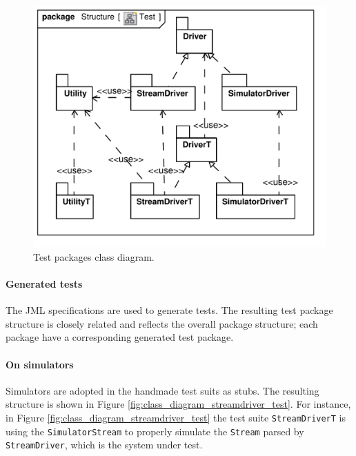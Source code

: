 \documentclass[english]{lni}
\newcommand{\lil}[1]{\texttt{\lstinline|#1|}}
\begin{document}
\begin{figure}[htb!]
  \centering
  \includegraphics[scale=0.4]{UML_model/Class_Diagram__Structure__Test}
  \caption{Test packages class diagram.}
  \label{fig:class_diagram_test}
\end{figure}

\paragraph*{Generated tests}

The JML specifications are used to generate tests.
The resulting test package structure is closely related and reflects the overall package structure; each package have a corresponding generated test package.


\paragraph*{On simulators}

Simulators are adopted in the handmade test suits as stubs.
The resulting structure is shown in Figure \ref{fig:class_diagram_streamdriver_test}.  
For instance, in Figure \ref{fig:class_diagram_streamdriver_test} the test suite \lil{StreamDriverT} is using the \lil{SimulatorStream} to properly simulate the \lil{Stream} parsed by \lil{StreamDriver}, which is the system under test.
\end{document}
